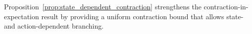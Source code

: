\documentclass[preprint,12pt]{elsarticle} %
\theoremstyle{plain}
\theoremstyle{definition}
\theoremstyle{remark}
\newtheorem{remark}[theorem]{Remark}
\begin{document}

Proposition~\ref{prop:state_dependent_contraction} strengthens the contraction-in-expectation result
by providing a uniform contraction bound that allows state- and action-dependent branching. 
\end{document}
